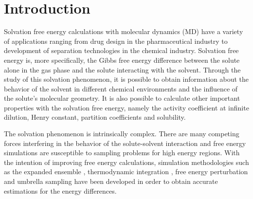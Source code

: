 \chapter{Introduction} %

\label{Chapter1} %

Solvation free energy calculations with molecular dynamics (MD) have a variety of applications ranging from drug design in the pharmaceutical industry to development of separation technologies in the chemical industry. Solvation free energy is, more specifically, the Gibbs free energy difference between the solute alone in the gas phase and the solute interacting with the solvent. Through the study of this solvation phenomenon, it is possible to obtain information about the behavior of the solvent in different chemical environments and the influence of the solute's molecular geometry. It is also possible to calculate other important properties with the solvation free energy, namely the activity coefficient at infinite dilution, Henry constant, partition coefficients and solubility. 

The solvation phenomenon is intrinsically complex. There are many competing forces interfering in the behavior of the solute-solvent interaction and free energy simulations are susceptible to sampling problems for high energy regions. With the intention of improving free energy calculations, simulation methodologies such as the expanded ensemble \cite{lyubartsev}, thermodynamic integration \cite{kirkwood1935}, free energy perturbation \cite{zwanzig1954,bennet1976,mbar} and umbrella sampling \cite{TORRIE1977187} have been developed in order to obtain accurate estimations for the energy differences. 

